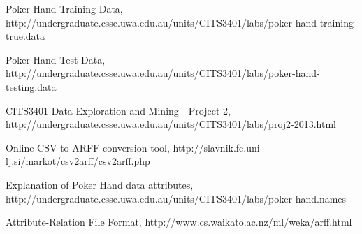 \documentclass[11pt, a4paper]{article}
\begin{document}
\begin{thebibliography}{9}

	Poker Hand Training Data,	
	http://undergraduate.csse.uwa.edu.au/units/CITS3401/labs/poker-hand-training-true.data
	
	Poker Hand Test Data,	
	http://undergraduate.csse.uwa.edu.au/units/CITS3401/labs/poker-hand-testing.data
	
	CITS3401 Data Exploration and Mining - Project 2,
	http://undergraduate.csse.uwa.edu.au/units/CITS3401/labs/proj2-2013.html

	Online CSV to ARFF conversion tool,
	http://slavnik.fe.uni-lj.si/markot/csv2arff/csv2arff.php

	Explanation of Poker Hand data attributes,
	http://undergraduate.csse.uwa.edu.au/units/CITS3401/labs/poker-hand.names

	Attribute-Relation File Format,
	http://www.cs.waikato.ac.nz/ml/weka/arff.html

\end{thebibliography}


\end{document}
